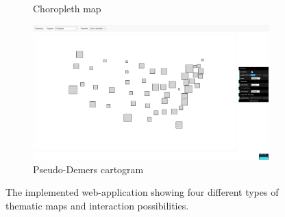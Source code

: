 \begin{figure}
\begin{subfigure}[b]{0.475\textwidth}
        \caption[Choropleth map]%
        {{\small Choropleth map}}
        \label{f:showcase-choropleth}
    \end{subfigure}
    \quad
    \begin{subfigure}[b]{0.475\textwidth}
        \centering
        \includegraphics[width=\textwidth]{images/results/map_cartogram.png}
        \caption[Pseudo-Demers cartogram]%
        {{\small Pseudo-Demers cartogram}}
        \label{f:showcase-cartogram}
    \end{subfigure}
    \caption[The implemented web-application showing four different types of thematic maps and interaction possibilities.]
    {\small The implemented web-application showing four different types of thematic maps and interaction possibilities.}
    \label{f:showcase-overall}
\end{figure}

%
%